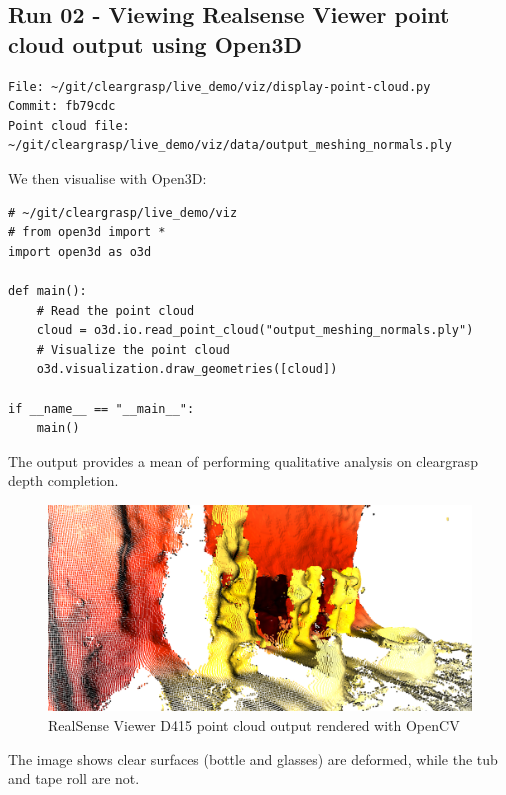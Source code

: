 
\subsection{Run 02 - Viewing Realsense Viewer point cloud output using Open3D}
\label{app_res:02}
\begin{verbatim}
File: ~/git/cleargrasp/live_demo/viz/display-point-cloud.py
Commit: fb79cdc
Point cloud file: ~/git/cleargrasp/live_demo/viz/data/output_meshing_normals.ply
\end{verbatim}
 We then visualise with Open3D:
\begin{verbatim}
# ~/git/cleargrasp/live_demo/viz
# from open3d import *    
import open3d as o3d

def main():
    # Read the point cloud
    cloud = o3d.io.read_point_cloud("output_meshing_normals.ply") 
    # Visualize the point cloud   
    o3d.visualization.draw_geometries([cloud])   

if __name__ == "__main__":
    main()
\end{verbatim}

The output provides a mean of performing qualitative analysis on cleargrasp depth completion.
\begin{figure}[h!]
\centering
\includegraphics[width=\textwidth]{Figures/OpenCV-point-cloud-import-2.png}
\caption{RealSense Viewer D415 point cloud output rendered with OpenCV}
\label{fig:realsenseOutputForReport1}
\end{figure}
The image shows clear surfaces (bottle and glasses) are deformed, while the tub and tape roll are not.

